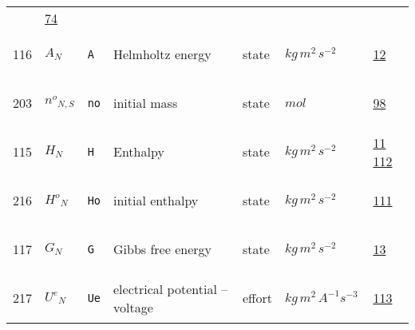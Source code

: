 \begin{longtable}{|p{1cm}|p{2.5cm}|p{4.5cm}|p{8cm}|p{3.0cm}|p{3cm}|p{1cm}|}
             &                 \hyperlink{"e:74"}{ 74 }
                 \\
            116
             & \hypertarget{"v:116"}{ $ {A}{_{N}} $}
             & \verb|A|
             & Helmholtz energy
             & \begin{lay}state \end{lay}
             & $ kg \,m^{2} \,s^{-2} \, $
             &                 \hyperlink{"e:12"}{ 12 }
                 \\
            203
             & \hypertarget{"v:203"}{ $ {{n^o}}{_{N, S}} $}
             & \verb|no|
             & initial mass
             & \begin{lay}state \end{lay}
             & $ mol \, $
             &                 \hyperlink{"e:98"}{ 98 }
                 \\
            115
             & \hypertarget{"v:115"}{ $ {H}{_{N}} $}
             & \verb|H|
             & Enthalpy
             & \begin{lay}state \end{lay}
             & $ kg \,m^{2} \,s^{-2} \, $
             &                 \hyperlink{"e:11"}{ 11 }
                                 \hyperlink{"e:112"}{ 112 }
                 \\
            216
             & \hypertarget{"v:216"}{ $ {{H^o}}{_{N}} $}
             & \verb|Ho|
             & initial enthalpy
             & \begin{lay}state \end{lay}
             & $ kg \,m^{2} \,s^{-2} \, $
             &                 \hyperlink{"e:111"}{ 111 }
                 \\
            117
             & \hypertarget{"v:117"}{ $ {G}{_{N}} $}
             & \verb|G|
             & Gibbs free energy
             & \begin{lay}state \end{lay}
             & $ kg \,m^{2} \,s^{-2} \, $
             &                 \hyperlink{"e:13"}{ 13 }
                 \\
            217
             & \hypertarget{"v:217"}{ $ {{U^e}}{_{N}} $}
             & \verb|Ue|
             & electrical potential -- voltage
             & \begin{lay}effort \end{lay}
             & $ kg \,m^{2} \,A^{-1} s^{-3} \, $
             &                 \hyperlink{"e:113"}{ 113 }
                 \\

\end{longtable}
